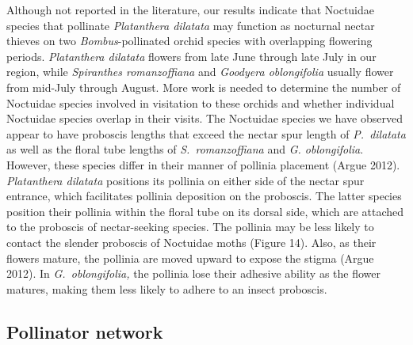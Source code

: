 \begin{multicols}{2}
Although not reported in the literature, our results indicate that
Noctuidae species that pollinate \emph{Platanthera dilatata} may
function as nocturnal nectar thieves on two \emph{Bombus}-pollinated
orchid species with overlapping flowering periods. \emph{Platanthera
dilatata} flowers from late June through late July in our region, while
\emph{Spiranthes romanzoffiana} and \emph{Goodyera oblongifolia} usually
flower from mid-July through August. More work is needed to determine
the number of Noctuidae species involved in visitation to these orchids
and whether individual Noctuidae species overlap in their visits. The
Noctuidae species we have observed appear to have proboscis lengths that
exceed the nectar spur length of \emph{P.\ dilatata} as well as the
floral tube lengths of \emph{S.\ romanzoffiana} and \emph{G.
oblongifolia}. However, these species differ in their manner of pollinia
placement (Argue 2012). \emph{Platanthera dilatata} positions its
pollinia on either side of the nectar spur entrance, which facilitates
pollinia deposition on the proboscis. The latter species position their
pollinia within the floral tube on its dorsal side, which are attached
to the proboscis of nectar-seeking species. The pollinia may be less
likely to contact the slender proboscis of Noctuidae moths (Figure 14).
Also, as their flowers mature, the pollinia are moved upward to expose
the stigma (Argue 2012). In \emph{G.\ oblongifolia,} the pollinia lose
their adhesive ability as the flower matures, making them less likely to
adhere to an insect proboscis.

\subsection{Pollinator network}


\end{multicols}
